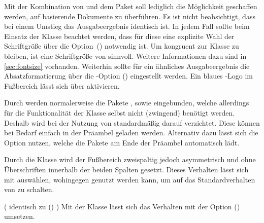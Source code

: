 \begin{Entity*}{}
Mit der Kombination von  und dem Paket 
soll lediglich die Möglichkeit geschaffen werden, auf  
basierende Dokumente zu überführen. Es ist nicht beabsichtigt, dass bei einem 
Umstieg das Ausgabeergebnis identisch ist. In jedem Fall sollte beim Einsatz 
der Klasse  beachtet werden, dass für diese eine explizite 
Wahl der Schriftgröße über die Option~() 
notwendig ist. Um kongruent zur Klasse  zu bleiben, ist 
eine Schriftgröße von  sinnvoll. Weitere Informationen dazu 
sind in \autoref{sec:fontsize} vorhanden. Weiterhin sollte für ein ähnliches 
Ausgabeergebnis die Absatzformatierung über die \KOMAScript-Option 
() eingestellt werden. Ein blaues 
\DDC-Logo im Fußbereich lässt sich über  aktivieren.

\begin{Declaration}{}
\printdeclarationlist%
%
Durch  werden normalerweise die Pakete , 
 sowie  eingebunden, welche allerdings für 
die Funktionalität der Klasse selbst nicht (zwingend) benötigt werden. Deshalb 
wird bei der Nutzung von  standardmäßig darauf verzichtet. 
Diese können bei Bedarf einfach in der Präambel geladen werden. Alternativ 
dazu 
lässt sich die Option  nutzen, welche die Pakete am Ende 
der Präambel automatisch lädt.
\end{Declaration}

\begin{Declaration}{}%
\printdeclarationlist%
%
Durch die Klasse  wird der Fußbereich zweispaltig jedoch 
asymmetrisch und ohne Überschriften innerhalb der beiden Spalten gesetzt. 
Dieses Verhalten lässt sich mit  auswählen, wohingegen 
 genutzt werden kann, um auf das Standardverhalten 
von  zu schalten.
\end{Declaration}

\begin{Declaration}{}(%
  identisch zu ()%
)
\printdeclarationlist%
%
Mit der Klasse  lässt sich das Verhalten mit der Option 
() umsetzen.
\end{Declaration}


\end{Entity*}
